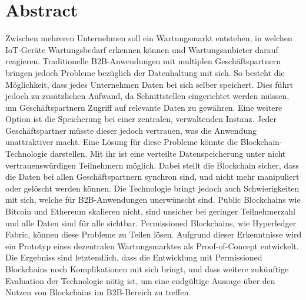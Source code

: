 \pagestyle{empty} %


\chapter*{Abstract} %
\label{cha:abtract}
Zwischen mehreren Unternehmen soll ein Wartungsmarkt entstehen, in welchen IoT-Geräte Wartungsbedarf erkennen können und Wartungsanbieter darauf reagieren. Traditionelle B2B-Anwendungen mit multiplen Geschäftspartnern bringen jedoch Probleme bezüglich der Datenhaltung mit sich. So besteht die Möglichkeit, dass jedes Unternehmen Daten bei sich selber speichert. Dies führt jedoch zu zusätzlichen Aufwand, da Schnittstellen eingerichtet werden müssen, um Geschäftspartnern Zugriff auf relevante Daten zu gewähren. Eine weitere Option ist die Speicherung bei einer zentralen, verwaltenden Instanz. Jeder Geschäftspartner müsste dieser jedoch vertrauen, was die Anwendung unattraktiver macht. Eine Lösung für diese Probleme könnte die Blockchain-Technologie darstellen. Mit ihr ist eine verteilte Datenspeicherung unter nicht vertrauenswürdigen Teilnehmern möglich. Dabei stellt die Blockchain sicher, dass die Daten bei allen Geschäftspartnern synchron sind, und nicht mehr manipuliert oder gelöscht werden können. Die Technologie bringt jedoch auch Schwierigkeiten mit sich, welche für B2B-Anwendungen unerwünscht sind. Public Blockchains wie Bitcoin und Ethereum skalieren nicht, sind unsicher bei geringer Teilnehmerzahl und alle Daten sind für alle sichtbar. Permissioned Blockchains, wie Hyperledger Fabric, können diese Probleme zu Teilen lösen. Aufgrund dieser Erkenntnisse wird ein Prototyp eines dezentralen Wartungsmarktes als Proof-of-Concept entwickelt. Die Ergebniss sind letztendlich, dass die Entwicklung mit Permissioned Blockchains noch Komplikationen mit sich bringt, und dass weitere zukünftige Evaluation der Technologie nötig ist, um eine endgültige Aussage über den Nutzen von Blockchains im B2B-Bereich zu treffen.
